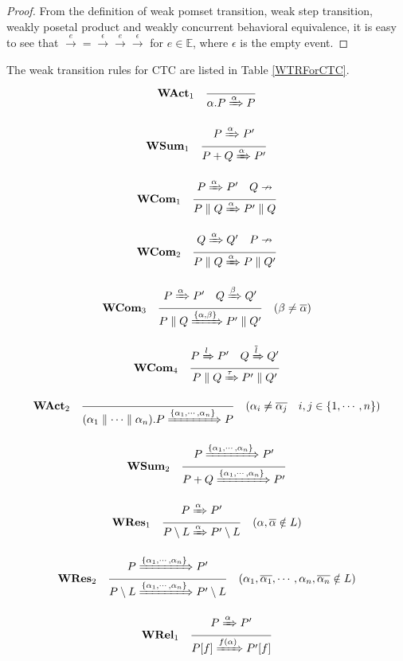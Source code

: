 \begin{proof}
From the definition of weak pomset transition, weak step transition, weakly posetal product and weakly concurrent behavioral equivalence, it is easy to see that $\xrightarrow{e}=\xrightarrow{\epsilon}\xrightarrow{e}\xrightarrow{\epsilon}$ for $e\in \mathbb{E}$, where $\epsilon$ is the empty event.
\end{proof}

The weak transition rules for CTC are listed in Table \ref{WTRForCTC}.

\begin{center}
    \begin{table}
        \[\textbf{WAct}_1\quad \frac{}{\alpha.P\xRightarrow{\alpha}P}\]

        \[\textbf{WSum}_1\quad \frac{P\xRightarrow{\alpha}P'}{P+Q\xRightarrow{\alpha}P'}\]

        \[\textbf{WCom}_1\quad \frac{P\xRightarrow{\alpha}P'\quad Q\nrightarrow}{P\parallel Q\xRightarrow{\alpha}P'\parallel Q}\]

        \[\textbf{WCom}_2\quad \frac{Q\xRightarrow{\alpha}Q'\quad P\nrightarrow}{P\parallel Q\xRightarrow{\alpha}P\parallel Q'}\]

        \[\textbf{WCom}_3\quad \frac{P\xRightarrow{\alpha}P'\quad Q\xRightarrow{\beta}Q'}{P\parallel Q\xRightarrow{\{\alpha,\beta\}}P'\parallel Q'}\quad (\beta\neq\overline{\alpha})\]

        \[\textbf{WCom}_4\quad \frac{P\xRightarrow{l}P'\quad Q\xRightarrow{\overline{l}}Q'}{P\parallel Q\xRightarrow{\tau}P'\parallel Q'}\]

        \[\textbf{WAct}_2\quad \frac{}{(\alpha_1\parallel\cdots\parallel\alpha_n).P\xRightarrow{\{\alpha_1,\cdots,\alpha_n\}}P}\quad (\alpha_i\neq\overline{\alpha_j}\quad i,j\in\{1,\cdots,n\})\]

        \[\textbf{WSum}_2\quad \frac{P\xRightarrow{\{\alpha_1,\cdots,\alpha_n\}}P'}{P+Q\xRightarrow{\{\alpha_1,\cdots,\alpha_n\}}P'}\]

        \[\textbf{WRes}_1\quad \frac{P\xRightarrow{\alpha}P'}{P\setminus L\xRightarrow{\alpha}P'\setminus L}\quad (\alpha,\overline{\alpha}\notin L)\]

        \[\textbf{WRes}_2\quad \frac{P\xRightarrow{\{\alpha_1,\cdots,\alpha_n\}}P'}{P\setminus L\xRightarrow{\{\alpha_1,\cdots,\alpha_n\}}P'\setminus L}\quad (\alpha_1,\overline{\alpha_1},\cdots,\alpha_n,\overline{\alpha_n}\notin L)\]

        \[\textbf{WRel}_1\quad \frac{P\xRightarrow{\alpha}P'}{P[f]\xRightarrow{f(\alpha)}P'[f]}\]


\end{table}
\end{center}
